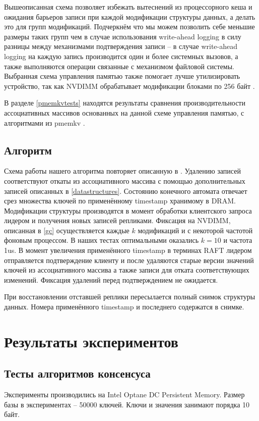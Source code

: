 \documentclass[pdftex,ptm,12pt,a4paper]{report}
\theoremstyle{definition}
\begin{document}
Вышеописанная схема позволяет избежать вытеснений из процессорного кеша и ожидания барьеров записи при каждой модификации структуры данных, а делать это для групп модификаций.
Подчеркнём что мы можем позволить себе меньшие размеры таких групп чем в случае использования write-ahead logging в силу разницы между механизмами подтверждения записи --
в случае write-ahead logging на каждую запись производится один и более системных вызовов, а также выполняются операции связанные с механизмом файловой системы.
Выбранная схема управления памятью также помогает лучше утилизировать устройство, так как NVDIMM обрабатывает модификации блоками по 256 байт \cite{izraelevitz2019basic}.

В разделе \ref{pmemkvtests} находятся результаты сравнения производительности ассоциативных массивов основанных на данной схеме управления памятью, с алгоритмами из pmemkv \cite{pmemkv}.

\section{Алгоритм}
Схема работы нашего алгоритма повторяет описанную в \cite{raftpaper}. Удалению записей соответствуют откаты из ассоциативного массива с помощью дополнительных записей описанных в \ref{datastructures}. Состоянию конечного автомата отвечает срез множества ключей по применённому timestamp хранимому в DRAM. Модификации структуры производятся в момент обработки
клиентского запроса лидером и получения новых записей репликами. Фиксация на NVDIMM, описанная в \ref{gc} осуществляется каждые $k$ модификаций и с некоторой частотой фоновым процессом.
В наших тестах оптимальными оказались $k=10$ и частота 1us. В момент увеличения применённого timestamp в терминах RAFT лидером отправляется подтверждение клиенту и после удаляются
старые версии значений ключей из ассоциативного массива а также записи для отката соответствующих изменений. Фиксация удалений перед подтверждением не ожидается.

При восстановлении отставшей реплики пересылается полный снимок структуры данных. Номера применённого timestamp и последнего содержатся в снимке.

\chapter{Результаты экспериментов}
\section{Тесты алгоритмов консенсуса}
Эксперименты производились на Intel Optane DC Persistent Memory.
Размер базы в экспериментах -- 50000 ключей. Ключи и значения занимают порядка 10 байт.
\end{document}
